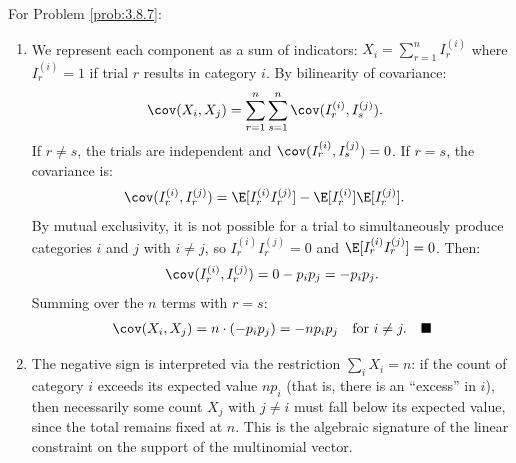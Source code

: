 \begin{solucion}
	\label{sol:3.8.7}
	For Problem \ref{prob:3.8.7}:
	\begin{enumerate}
		\item We represent each component as a sum of indicators: $X_{i} = \sum_{r=1}^{n} I_{r}^{(i)}$ where $I_{r}^{(i)} = 1$ if trial $r$ results in category $i$. By bilinearity of covariance:
		\begin{align*}
			\cov(X_{i}, X_{j}) &= \sum_{r=1}^{n} \sum_{s=1}^{n} \cov(I_{r}^{(i)}, I_{s}^{(j)}).
		\end{align*}
		If $r \neq s$, the trials are independent and $\cov(I_{r}^{(i)}, I_{s}^{(j)}) = 0$. If $r = s$, the covariance is:
		\begin{align*}
			\cov(I_{r}^{(i)}, I_{r}^{(j)}) &= \E[I_{r}^{(i)} I_{r}^{(j)}] - \E[I_{r}^{(i)}] \E[I_{r}^{(j)}].
		\end{align*}
		By mutual exclusivity, it is not possible for a trial to simultaneously produce categories $i$ and $j$ with $i \neq j$, so $I_{r}^{(i)} I_{r}^{(j)} = 0$ and $\E[I_{r}^{(i)} I_{r}^{(j)}] = 0$. Then:
		\begin{align*}
			\cov(I_{r}^{(i)}, I_{r}^{(j)}) = 0 - p_{i} p_{j} = -p_{i} p_{j}.
		\end{align*}
		Summing over the $n$ terms with $r = s$:
		\begin{align*}
			\cov(X_{i}, X_{j}) = n \cdot (-p_{i} p_{j}) = -n p_{i} p_{j} \quad \text{for } i \neq j. \quad \blacksquare
		\end{align*}
		\item The negative sign is interpreted via the restriction $\sum_{i} X_{i} = n$: if the count of category $i$ exceeds its expected value $np_{i}$ (that is, there is an ``excess'' in $i$), then necessarily some count $X_{j}$ with $j \neq i$ must fall below its expected value, since the total remains fixed at $n$. This is the algebraic signature of the linear constraint on the support of the multinomial vector.
	\end{enumerate}
\end{solucion}

